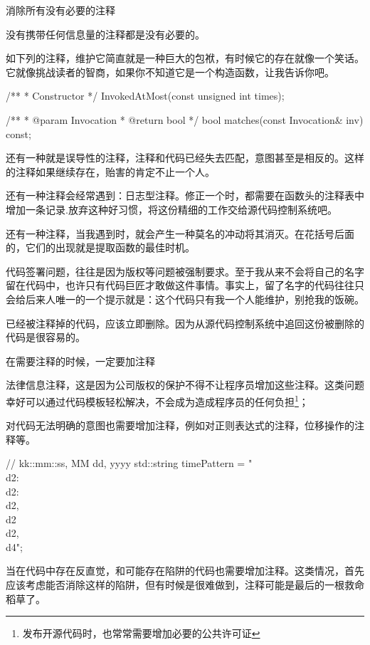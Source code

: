 \begin{content}

\begin{regulation}
消除所有没有必要的注释
\end{regulation}

没有携带任何信息量的注释都是没有必要的。

如下列的注释，维护它简直就是一种巨大的包袱，有时候它的存在就像一个笑话。它就像挑战读者的智商，如果你不知道它是一个构造函数，让我告诉你吧。

\begin{leftbar}
\begin{c++}
/**
 * Constructor
 */
InvokedAtMost(const unsigned int times);

/**
 * @param Invocation
 * @return bool
 */
bool matches(const Invocation& inv) const;
\end{c++}
\end{leftbar}

还有一种就是误导性的注释，注释和代码已经失去匹配，意图甚至是相反的。这样的注释如果继续存在，贻害的肯定不止一个人。

还有一种注释会经常遇到：日志型注释。修正一个时，都需要在函数头的注释表中增加一条记录.放弃这种好习惯，将这份精细的工作交给源代码控制系统吧。

还有一种注释，当我遇到时，就会产生一种莫名的冲动将其消灭。在花括号后面的，它们的出现就是提取函数的最佳时机。

代码签署问题，往往是因为版权等问题被强制要求。至于我从来不会将自己的名字留在代码中，也许只有代码巨匠才敢做这件事情。事实上，留了名字的代码往往只会给后来人唯一的一个提示就是：这个代码只有我一个人能维护，别抢我的饭碗。

已经被注释掉的代码，应该立即删除。因为从源代码控制系统中追回这份被删除的代码是很容易的。

\begin{regulation}
在需要注释的时候，一定要加注释
\end{regulation}

法律信息注释，这是因为公司版权的保护不得不让程序员增加这些注释。这类问题幸好可以通过代码模板轻松解决，不会成为造成程序员的任何负担\footnote{发布开源代码时，也常常需要增加必要的公共许可证}；

对代码无法明确的意图也需要增加注释，例如对正则表达式的注释，位移操作的注释等。

\begin{leftbar}
\begin{c++}
// kk::mm::ss, MM dd, yyyy
std::string timePattern = "\\d{2}:\\d{2}:\\d{2}, \\d{2} \\d{2}, \\d{4}";
\end{c++}
\end{leftbar}

当在代码中存在反直觉，和可能存在陷阱的代码也需要增加注释。这类情况，首先应该考虑能否消除这样的陷阱，但有时候是很难做到，注释可能是最后的一根救命稻草了。

\end{content}

